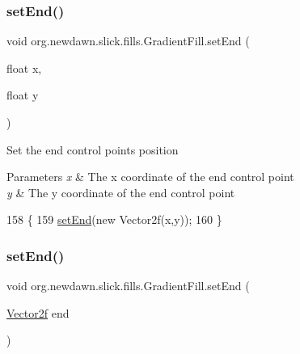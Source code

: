 \subsubsection{\texorpdfstring{set\+End()}{setEnd()}\hspace{0.1cm}{\footnotesize\ttfamily [1/2]}}
{\footnotesize\ttfamily void org.\+newdawn.\+slick.\+fills.\+Gradient\+Fill.\+set\+End (\begin{DoxyParamCaption}\item[{float}]{x,  }\item[{float}]{y }\end{DoxyParamCaption})\hspace{0.3cm}{\ttfamily [inline]}}

Set the end control point\textquotesingle{}s position


\begin{DoxyParams}{Parameters}
{\em x} & The x coordinate of the end control point \\
\hline
{\em y} & The y coordinate of the end control point \\
\hline
\end{DoxyParams}

\begin{DoxyCode}
158                                          \{
159         \mbox{\hyperlink{classorg_1_1newdawn_1_1slick_1_1fills_1_1_gradient_fill_ab2f7ec3c613d0099d65927de537b407a}{setEnd}}(\textcolor{keyword}{new} Vector2f(x,y));
160     \}
\end{DoxyCode}
\mbox{\label{classorg_1_1newdawn_1_1slick_1_1fills_1_1_gradient_fill_aff88bba7f0f1177c7fa011248ab442f7}} 
\subsubsection{\texorpdfstring{set\+End()}{setEnd()}\hspace{0.1cm}{\footnotesize\ttfamily [2/2]}}
{\footnotesize\ttfamily void org.\+newdawn.\+slick.\+fills.\+Gradient\+Fill.\+set\+End (\begin{DoxyParamCaption}\item[{\mbox{\hyperlink{classorg_1_1newdawn_1_1slick_1_1geom_1_1_vector2f}{Vector2f}}}]{end }\end{DoxyParamCaption})\hspace{0.3cm}{\ttfamily [inline]}}

